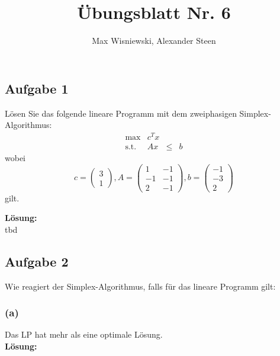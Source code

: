 \documentclass[11pt,a4paper,ngerman]{article}
\date{}
\title{Übungsblatt Nr. 6}
\author{Max Wisniewski, Alexander Steen}
\begin{document}
\renewcommand{\figurename}{Figure}
\maketitle
\thispagestyle{fancy}


\subsection*{Aufgabe 1}

Lösen Sie das folgende lineare Programm mit dem zweiphasigen Simplex-Algorithmus:
\begin{equation*}\begin{array}{rlcr}
    \max &c^Tx\\
    \text{s.t.} & A x & \leq & b
\end{array}\end{equation*}
wobei 
\begin{equation*}
c = \left( \begin{array}{c} 3 \\ 1 \end{array}\right), A = \left( \begin{array}{cc} 1 & -1 \\ -1 & -1 \\ 2 & -1\end{array}\right), b =
\left( \begin{array}{c} -1 \\ -3 \\ 2 \end{array}\right)
\end{equation*}
gilt.

\textbf{Lösung:}\\

tbd

\subsection*{Aufgabe 2}

Wie reagiert der Simplex-Algorithmus, falls für das lineare Programm gilt:

\subsubsection*{(a)}
Das LP hat mehr als eine optimale Lösung.\\

\textbf{Lösung:}\\
\end{document}
